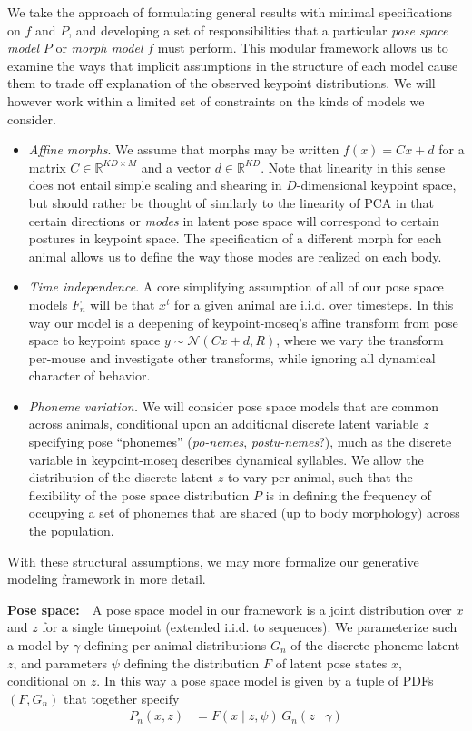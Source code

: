 \documentclass{article}         %
\newcommand{\RR}{\mathbb{R}}
\newcommand{\NN}{\mathcal{N}}
\renewcommand{\cal}[1]{\mathcal{#1}}
\begin{document}
We take the approach of formulating general results with minimal specifications on $f$ and $P$, and developing a set of responsibilities that a particular \textit{pose space model} $P$ or \textit{morph model} $f$ must perform. This modular framework allows us to examine the ways that implicit assumptions in the structure of each model cause them to trade off explanation of the observed keypoint distributions. We will however work within a limited set of constraints on the kinds of models we consider.
\begin{itemize}
\item \textit{Affine morphs}. We assume that morphs may be written $f(x) = C x + d$ for a matrix $C\in \RR^{KD\times M}$ and a vector $d\in \RR^{KD}$. Note that linearity in this sense does not entail simple scaling and shearing in $D$-dimensional keypoint space, but should rather be thought of similarly to the linearity of PCA in that certain directions or \textit{modes} in latent pose space will correspond to certain postures in keypoint space. The specification of a different morph for each animal allows us to define the way those modes are realized on each body.

\item \textit{Time independence}. A core simplifying assumption of all of our pose space models $F_n$ will be that $x^t$ for a given animal are i.i.d. over timesteps. In this way our model is a deepening of keypoint-moseq's affine transform from pose space to keypoint space $y \sim \NN(Cx+d, R)$, where we vary the transform per-mouse and investigate other transforms, while ignoring all dynamical character of behavior. 

\item \textit{Phoneme variation.} We will consider pose space models that are common across animals, conditional upon an additional discrete latent variable $z$ specifying pose ``phonemes'' (\textit{po-nemes}, \textit{postu-nemes}?), much as the discrete variable in keypoint-moseq describes dynamical syllables. We allow the distribution of the discrete latent $z$ to vary per-animal, such that the flexibility of the pose space distribution $P$ is in defining the frequency of occupying a set of phonemes that are shared (up to body morphology) across the population.
\end{itemize}
With these structural assumptions, we may more formalize our generative modeling framework in more detail. 

\textbf{Pose space:}\ \ A pose space model in our framework is a joint distribution over $x$ and $z$ for a single timepoint (extended i.i.d. to sequences). We parameterize such a model by $\gamma$ defining per-animal distributions $G_n$ of the discrete phoneme latent $z$, and parameters $\psi$ defining the distribution $F$ of latent pose states $x$, conditional on $z$. In this way a pose space model is given by a tuple of PDFs $(F, G_n)$ that together specify
\begin{align}
    P_n(x, z) &= F(x \mid z, \psi)\,G_n(z \mid \gamma)
\end{align}
\end{document}
